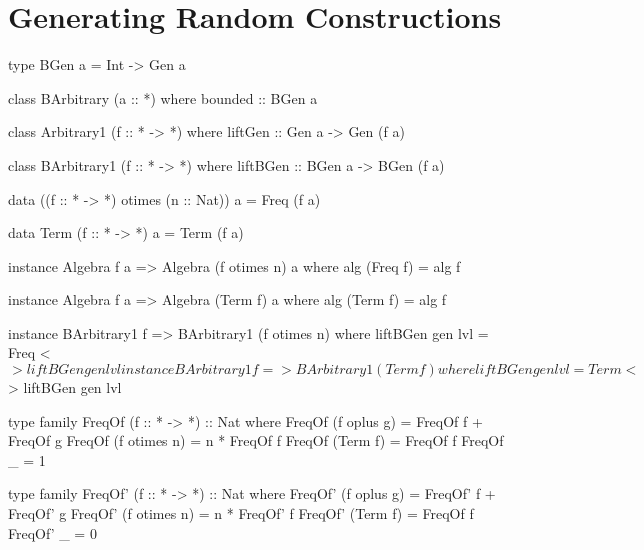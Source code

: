 \section{Generating Random Constructions}
\label{sec:generators}


\begin{code}
type BGen a = Int -> Gen a

class BArbitrary (a :: *) where
  bounded :: BGen a
\end{code}


\begin{code}
class Arbitrary1 (f :: * -> *) where
  liftGen :: Gen a -> Gen (f a)
\end{code}

\begin{code}
class BArbitrary1 (f :: * -> *) where
  liftBGen :: BGen a -> BGen (f a)
\end{code}

\begin{code}
data ((f :: * -> *) otimes (n :: Nat)) a = Freq (f a)
\end{code}

\begin{code}
data Term (f :: * -> *) a = Term (f a)
\end{code}

\begin{code}
instance Algebra f a => Algebra (f otimes n) a where
  alg (Freq f) = alg f
\end{code}

\begin{code}
instance Algebra f a => Algebra (Term f) a where
  alg (Term f) = alg f
\end{code}


\begin{code}
instance BArbitrary1 f => BArbitrary1 (f otimes n) where
  liftBGen gen lvl = Freq <$> liftBGen gen lvl

instance BArbitrary1 f => BArbitrary1 (Term f) where
  liftBGen gen lvl = Term <$> liftBGen gen lvl
\end{code}

\begin{code}
type family FreqOf (f :: * -> *) :: Nat where
  FreqOf (f oplus g)   = FreqOf f + FreqOf g
  FreqOf (f otimes n)  = n * FreqOf f
  FreqOf (Term f)      = FreqOf f
  FreqOf _             = 1
\end{code}

\begin{code}
type family FreqOf' (f :: * -> *) :: Nat where
  FreqOf' (f oplus g)   = FreqOf' f  +  FreqOf' g
  FreqOf' (f otimes n)  = n  *  FreqOf' f
  FreqOf' (Term f)      = FreqOf f
  FreqOf' _             = 0
\end{code}


